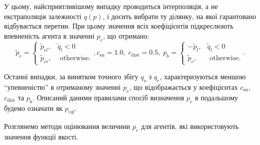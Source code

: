 \documentclass[a4paper,13pt]{atuaref}
\begin{document}
У цьому, найсприятливішому випадку проводиться інтерполяція, а не екстраполяція
залежності $q(p)$, і досить вибрати ту ділянку, на якої гарантовано
відбувається перетин. При цьому значення всіх коефіцієнтів підкреслюють
впевненість агента в значенні $p_e$, що отримано:
%
\begin{equation}
  \tilde{p}_e
  =
  \begin{cases}
    \tilde{p}_{el}, & \tilde{q}_l < 0
    \\
    \tilde{p}_{er}, & \text{ otherwise}.
  \end{cases}
  ,
  c_\mathrm{su} = 1.0, \;  c_\mathrm{dist} = 0.5,  \;
  p_b =
  \begin{cases}
    -\tilde{p}_l, & \tilde{q}_l < 0
    \\
    \tilde{p}_r, & \text{ otherwise}.
  \end{cases}.
  \label{atu:eq:pr_e4}
\end{equation}

Останні випадки, за винятком точного збігу $q_o$ з $q_c$,
характеризуються меншою ``упевненістю'' в отриманому значенні $p_e$,
що відображається у коефіцієнтах
$c_\mathrm{su}$, $c_\mathrm{dist}$ та  $p_b$.
%
Описаний даними правилами спосіб визначення $p_e$ в подальшому будемо
означати як $p_{eql}$\label{atu:d:p_eql}.


Розглянемо методи оцінювання величини $p_e$ для агентів, які використовують значення функції якості.
\end{document}
